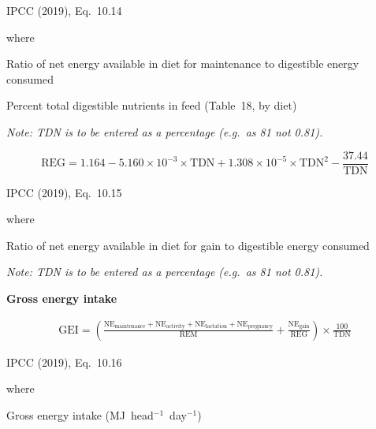 \noindent IPCC (2019), Eq.~10.14

\noindent where
\begin{description}[font=\normalfont, leftmargin=6em, style=sameline, nosep]
    \item[$\mathrm{REM}$] Ratio of net energy available in diet for maintenance to
          digestible energy consumed
    \item[$\mathrm{TDN}$] Percent total digestible nutrients in feed (Table~18,
          by diet)
\end{description}

\noindent\textit{Note: TDN is to be entered as a percentage (e.g.\ as 81 not 0.81).}

\begin{equation}
    \mathrm{REG} = 1.164 - 5.160 \times 10^{-3} \times \mathrm{TDN}
        + 1.308 \times 10^{-5} \times \mathrm{TDN}^{2}
        - \frac{37.44}{\mathrm{TDN}}
    \tag{Eq.\ 3.2.1.9}
\end{equation}

\noindent IPCC (2019), Eq.~10.15

\noindent where
\begin{description}[font=\normalfont, leftmargin=6em, style=sameline, nosep]
    \item[$\mathrm{REG}$] Ratio of net energy available in diet for gain to
          digestible energy consumed
\end{description}

\noindent\textit{Note: TDN is to be entered as a percentage (e.g.\ as 81 not 0.81).}

\bigskip
\noindent\textbf{Gross energy intake}

\begin{multline}
    \mathrm{GEI} =
        \left(\frac{\mathrm{NE}_{\mathrm{maintenance}} + \mathrm{NE}_{\mathrm{activity}}
            + \mathrm{NE}_{\mathrm{lactation}} + \mathrm{NE}_{\mathrm{pregnancy}}}
            {\mathrm{REM}}
        + \frac{\mathrm{NE}_{\mathrm{gain}}}{\mathrm{REG}}\right)
        \times \frac{100}{\mathrm{TDN}}
    \tag{Eq.\ 3.2.1.10}
\end{multline}

\noindent IPCC (2019), Eq.~10.16

\noindent where
\begin{description}[font=\normalfont, leftmargin=6em, style=sameline, nosep]
    \item[$\mathrm{GEI}$] Gross energy intake (MJ~head$^{-1}$~day$^{-1}$)
\end{description}

